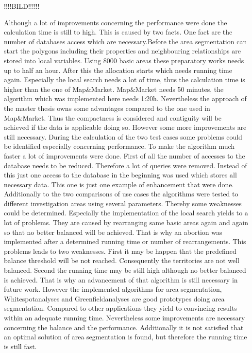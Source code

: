 !!!!BILD!!!!!!

Although a lot of improvements concerning the performance were done the calculation time is still to high. This is caused by two facts. One fact are the number of databases access which are necessary.Before the area segmentation can start the polygons including their properties and neighbouring relationships are stored into local variables. Using 8000 basic areas these preparatory works needs up to half an hour. After this the allocation starts which needs running time again. Especially the local search needs a lot of time, thus the calculation time is higher than the one of Map\&Market. Map\&Market needs 50 minutes, the algorithm which was implemented here needs 1:20h. Nevertheless the approach of the master thesis owns some advantages compared to the one used in Map\&Market. Thus the compactness is considered and contiguity will be achieved if the data is applicable doing so. However some more improvements are still necessary. During the calculation of the two test cases some problems could be identified especially concerning performance. To make the algorithm much faster a lot of improvements were done. First of all the number of accesses to the database needs to be reduced. Therefore a lot of queries were removed. Instead of this just one access to the database in the beginning was used which stores all necessary data. This one is just one example of enhancement that were done. \\
Additionally to the two comparisons of use cases the algorithms were tested to different investigation areas using several parameters. Thereby some weaknesses could be determined. Especially the implementation of the local search yields to a lot of problems. They are caused by rearranging same basic areas again and again so that no better balanced will be achieved. That is why an abortion was implemented after a determined running time or number of rearrangements. This problems leads to two weaknesses. First it may be happen that the predefined balance threshold will be not reached. Consequently the territories are not well balanced. Second the running time may be still high although no better balanced is achieved. That is why an advancement of that algorithm is still necessary in future work. However the implemented algorithms for area segmentation, Whitespotanalyses and Greenfieldanalyses are good prototypes doing area segmentation. Compared to other applications they yield to convincing results within an adequate running time. Nevertheless some improvements are necessary concerning the balance and the performance. Additionally it is not satisfied that an optimal solution of area segmentation is found, but therefore the running time is still fast. 

